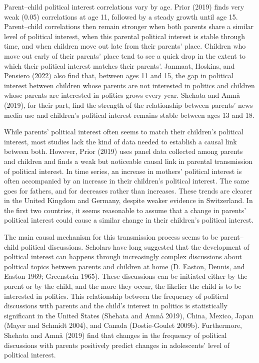 \documentclass[
  letterpaper,
  DIV=11,
  numbers=noendperiod]{scrreprt}
\begin{document}
Parent--child political interest correlations vary by age. Prior (2019)
finds very weak (0.05) correlations at age 11, followed by a steady
growth until age 15. Parent--child correlations then remain stronger
when both parents share a similar level of political interest, when this
parental political interest is stable through time, and when children
move out late from their parents' place. Children who move out early of
their parents' place tend to see a quick drop in the extent to which
their political interest matches their parents'. Janmaat, Hoskins, and
Pensiero (2022) also find that, between ages 11 and 15, the gap in
political interest between children whose parents are not interested in
politics and children whose parents are interested in politics grows
every year. Shehata and Amnå (2019), for their part, find the strength
of the relationship between parents' news media use and children's
political interest remains stable between ages 13 and 18.

While parents' political interest often seems to match their children's
political interest, most studies lack the kind of data needed to
establish a causal link between both. However, Prior (2019) uses panel
data collected among parents and children and finds a weak but
noticeable causal link in parental transmission of political interest.
In time series, an increase in mothers' political interest is often
accompanied by an increase in their children's political interest. The
same goes for fathers, and for decreases rather than increases. These
trends are clearer in the United Kingdom and Germany, despite weaker
evidence in Switzerland. In the first two countries, it seems reasonable
to assume that a change in parents' political interest could cause a
similar change in their children's political interest.

The main causal mechanism for this transmission process seems to be
parent--child political discussions. Scholars have long suggested that
the development of political interest can happens through increasingly
complex discussions about political topics between parents and children
at home (D. Easton, Dennis, and Easton 1969; Greenstein 1965). These
discussions can be initiated either by the parent or by the child, and
the more they occur, the likelier the child is to be interested in
politics. This relationship between the frequency of political
discussions with parents and the child's interest in politics is
statistically significant in the United States (Shehata and Amnå 2019),
China, Mexico, Japan (Mayer and Schmidt 2004), and Canada (Dostie-Goulet
2009b). Furthermore, Shehata and Amnå (2019) find that changes in the
frequency of political discussions with parents positively predict
changes in adolescents' level of political interest.
\end{document}
